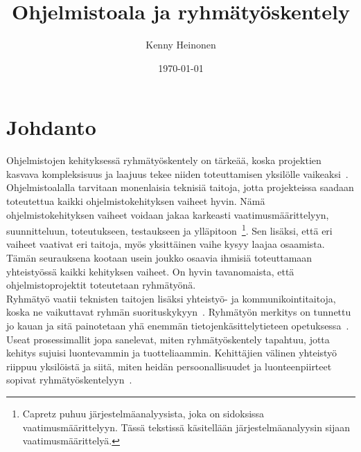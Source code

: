 \documentclass[finnish]{../tktltiki2}
\title{Ohjelmistoala ja ryhmätyöskentely}
\author{Kenny Heinonen}
\date{\today}
\theoremstyle{definition}
\theoremstyle{remark}
\begin{document}

\maketitle        %

\tableofcontents  %
\thispagestyle{empty}
\newpage          %



\section{Johdanto}

Ohjelmistojen kehityksessä ryhmätyöskentely on tärkeää, koska projektien
kasvava kompleksisuus ja laajuus tekee niiden toteuttamisen yksilölle
vaikeaksi~\cite{Jun:2010}.
Ohjelmistoalalla tarvitaan monenlaisia teknisiä taitoja, jotta projekteissa saadaan toteutettua kaikki ohjelmistokehityksen vaiheet 
hyvin. Nämä ohjelmistokehityksen vaiheet voidaan jakaa karkeasti 
vaatimusmäärittelyyn, suunnitteluun, toteutukseen, testaukseen ja 
ylläpitoon~\cite{Capretz:2010:MSS:1726559.1726574}\footnote{Capretz puhuu järjestelmäanalyysista, joka on sidoksissa vaatimusmäärittelyyn. Tässä tekstissä käsitellään järjestelmäanalyysin sijaan vaatimusmäärittelyä.}. Sen lisäksi, että 
eri vaiheet vaativat eri taitoja, myös yksittäinen vaihe kysyy laajaa 
osaamista. Tämän seurauksena kootaan usein joukko osaavia ihmisiä 
toteuttamaan yhteistyössä kaikki kehityksen vaiheet. On hyvin 
tavanomaista, että ohjelmistoprojektit toteutetaan ryhmätyönä.\\

Ryhmätyö vaatii teknisten taitojen lisäksi yhteistyö- ja kommunikointitaitoja, koska
ne vaikuttavat ryhmän suorituskykyyn~\cite{Hall:2007:CNT:1235000.1235043}. Ryhmätyön merkitys on
tunnettu jo kauan ja sitä painotetaan yhä enemmän tietojenkäsittelytieteen opetuksessa~\cite{Cushing:2003:TBP:948785.948797,Jun:2010,1158709,Pieterse:2012:PPS:2157136.2157218}.
Useat prosessimallit jopa sanelevat, miten ryhmätyöskentely tapahtuu, jotta kehitys sujuisi luontevammin ja tuotteliaammin.
Kehittäjien välinen yhteistyö riippuu yksilöistä ja siitä, miten heidän persoonallisuudet ja
luonteenpiirteet sopivat ryhmätyöskentelyyn~\cite{Acuna:2008:ESP:1414004.1414056,Hall:2007:CNT:1235000.1235043}.\\
\end{document}
